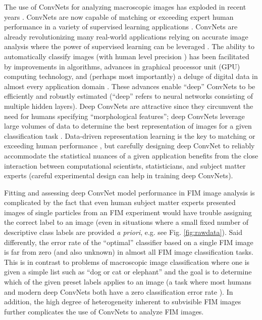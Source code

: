 \documentclass[%
reprint,
superscriptaddress,
 aps,
 pre,
]{revtex4-1}
\begin{document}
The use of ConvNets for analyzing macroscopic images has exploded in recent years \cite{LeCun2015}. 
ConvNets   
are now capable of matching or 
exceeding expert human performance in a variety of supervised learning applications  \cite{LeCun2015}.  
ConvNets  are already revolutionizing many real-world applications  
relying on accurate image analysis where the power of supervised learning can be leveraged  \cite{LeCun2015,Bojarski2016,Esteva2017,Zhu2017}.
The ability to automatically classify images (with human level precision \cite{LeCun2015}) has been facilitated by improvements in algorithms,
advances in graphical processor unit (GPU) computing technology, and (perhaps most importantly) a deluge of digital data in almost every application domain  \cite{LeCun2015,Krizhevsky2012,Srivastava2014,He2015,Ioffe2015,Goodfellow2013,Jaderberg2015a,Mallat2016,GoodfellowBook}.  
These advances enable ``deep'' ConvNets to be efficiently and robustly estimated  (``deep'' refers to neural networks consisting of multiple hidden layers).
Deep ConvNets are attractive since they circumvent the need for humans specifying ``morphological features''; deep ConvNets leverage large volumes of data to determine
the best representation of images for a given classification task \cite{LeCun2015}.  Data-driven representation learning is the key to matching or exceeding human performance \cite{LeCun2015}, but carefully  designing deep ConvNet to reliably accommodate the statistical nuances of a given application benefits from the close interaction between computational scientists, statisticians, and subject matter experts \cite{Esteva2017,Esteva2017} (careful experimental design can help in training deep ConvNets).  

Fitting and assessing deep ConvNet model performance in FIM image analysis is complicated by the fact that even human subject matter experts presented images of single particles from an FIM experiment would have trouble assigning the correct label to an image (even in situations where a small fixed number of descriptive class labels are provided \emph{a priori}, e.g. see Fig. \ref{fig:rawdata}).  Said differently, the error rate of the ``optimal''  classifier \cite{WassermanPopCultureBook} based on a single FIM image  is far from zero (and also unknown) in almost all FIM image classification tasks.  This is in contrast to problems of macroscopic image classification where one is given a simple list such as ``dog or cat or elephant'' and the goal is to determine which of the given preset labels applies to an image (a task where most humans and modern deep ConvNets both have a zero classification error rate \cite{LeCun2015}).  
 In addition,  the high degree of heterogeneity inherent to subvisible FIM images further complicates the use of ConvNets to analyze FIM images.
\end{document}
